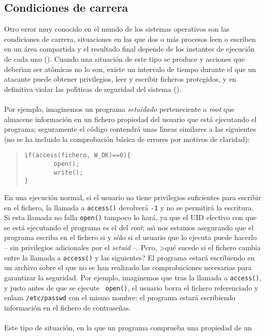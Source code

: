 \subsection{Condiciones de carrera}
Otro error muy conocido en el mundo de los sistemas operativos son las
condiciones de carrera, situaciones en las que dos o m\'as procesos leen o 
escriben en un \'area compartida y el resultado final depende de los instantes
de ejecuci\'on de cada uno (\cite{kn:tan91}). Cuando una situaci\'on de este
tipo se produce y acciones que deber\'{\i}an ser at\'omicas no lo son, existe 
un intervalo de tiempo durante el que un atacante puede obtener privilegios, 
leer y escribir ficheros protegidos, y en definitiva violar las pol\'{\i}ticas 
de seguridad del sistema (\cite{kn:bis95b}).\\
\\Por ejemplo, imaginemos un programa {\it setuidado} perteneciente a {\it root}
que almacene informaci\'on en un fichero propiedad del usuario que est\'a 
ejecutando el programa; seguramente el c\'odigo contendr\'a unas l\'{\i}neas
similares a las siguientes (no se ha incluido la comprobaci\'on b\'asica de
errores por motivos de claridad):
\begin{quote}
\begin{verbatim}
if(access(fichero, W_OK)==0){
        open();
        write();
}
\end{verbatim}
\end{quote}
En una ejecuci\'on normal, si el usuario no tiene privilegios suficientes para
escribir en el fichero, la llamada a {\tt access()} devolver\'a {\tt -1} y no
se permitir\'a la escritura. Si esta llamada no falla {\tt open()} tampoco lo
har\'a, ya que el UID efectivo con que se est\'a ejecutando el programa es el 
del {\it root}; as\'{\i} nos estamos asegurando que el programa escriba en el
fichero si y s\'olo si el usuario que lo ejecuta puede hacerlo -- sin 
privilegios adicionales por el {\it setuid} --. Pero, >qu\'e sucede si el 
fichero cambia entre la llamada a {\tt access()} y las siguientes? El programa
estar\'a escribiendo en un archivo sobre el que no se han realizado las
comprobaciones necesarias para garantizar la seguridad. Por ejemplo, imaginemos
que tras la llamada a {\tt access()}, y justo antes de que se ejecute {\tt
open()}, el usuario borra el fichero referenciado y enlaza {\tt /etc/passwd} con
el mismo nombre: el programa estar\'a escribiendo informaci\'on en el fichero
de contrase\~nas.\\
\\Este tipo de situaci\'on, en la que un programa comprueba una propiedad de un 
